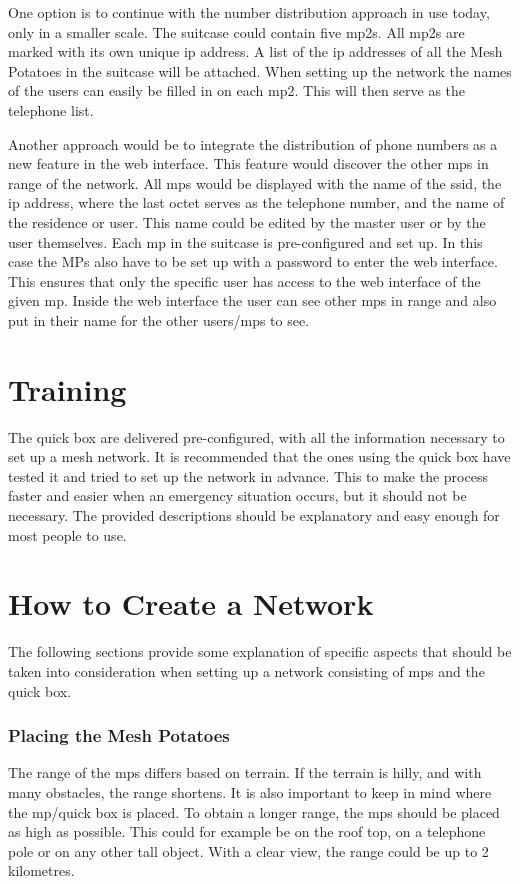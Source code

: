 One option is to continue with the number distribution approach in use today, only in a smaller scale. The suitcase could contain five \glspl{mp2}. All \glspl{mp2} are marked with its own unique \gls{ip} address. A list of the \gls{ip} addresses of all the Mesh Potatoes in the suitcase will be attached. When setting up the network the names of the users can easily be filled in on each \gls{mp2}. This will then serve as the telephone list. 

Another approach would be to integrate the distribution of phone numbers as a new feature in the web interface. This feature would discover the other \glspl{mp} in range of the network. All \glspl{mp} would be displayed with the name of the \gls{ssid}, the \gls{ip} address, where the last octet serves as the telephone number, and the name of the residence or user. This name could be edited by the master user or by the user themselves. Each \gls{mp} in the suitcase is pre-configured and set up. In this case the MPs also have to be set up with a password to enter the web interface. This ensures that only the specific user has access to the web interface of the given \gls{mp}. Inside the web interface the user can see other \glspl{mp} in range and also put in their name for the other users/\glspl{mp} to see. 

\section{Training}
The \gls{quick} box are delivered pre-configured, with all the  information necessary to set up a mesh network. It is recommended that the ones using the \gls{quick} box have tested it and tried to set up the network in advance. This to make the process faster and easier when an emergency situation occurs, but it should not be necessary. The provided descriptions should be explanatory and easy enough for most people to use.


\section{How to Create a Network}
The following sections provide some explanation of specific aspects that should be taken into consideration when setting up a network consisting of \glspl{mp} and the \gls{quick} box. 

\subsubsection{Placing the Mesh Potatoes}
The range of the \glspl{mp} differs based on terrain. If the terrain is hilly, and with many obstacles, the range shortens. It is also important to keep in mind where the \gls{mp}/\gls{quick} box is placed. To obtain a longer range, the \glspl{mp} should be placed as high as possible. This could for example be on the roof top, on a telephone pole or on any other tall object. With a clear view, the range could be up to 2 kilometres. 

